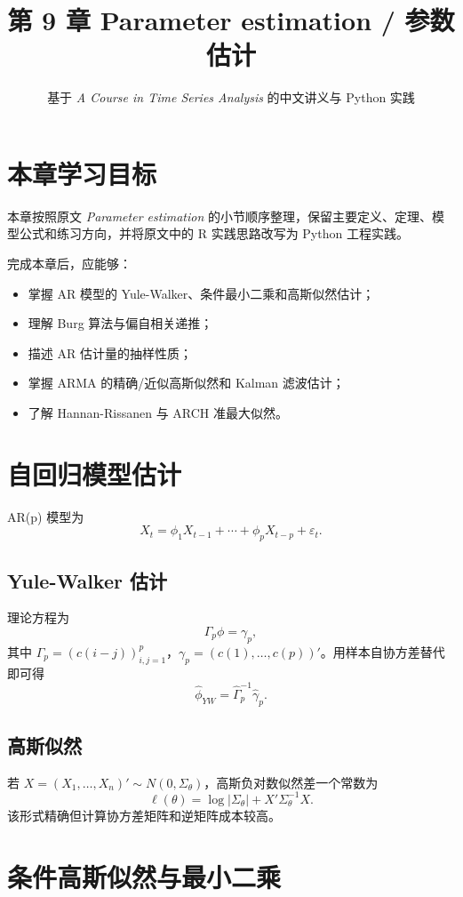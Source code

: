 \documentclass[11pt,a4paper]{ctexart}
\title{第 9 章 \quad Parameter estimation / 参数估计}
\author{基于 \textit{A Course in Time Series Analysis} 的中文讲义与 Python 实践}
\date{}
\begin{document}
\maketitle

\section*{本章学习目标}

本章按照原文 \textit{Parameter estimation} 的小节顺序整理，保留主要定义、定理、模型公式和练习方向，并将原文中的 R 实践思路改写为 Python 工程实践。

完成本章后，应能够：
\begin{itemize}
  \item 掌握 AR 模型的 Yule-Walker、条件最小二乘和高斯似然估计；
  \item 理解 Burg 算法与偏自相关递推；
  \item 描述 AR 估计量的抽样性质；
  \item 掌握 ARMA 的精确/近似高斯似然和 Kalman 滤波估计；
  \item 了解 Hannan-Rissanen 与 ARCH 准最大似然。
\end{itemize}

\section{自回归模型估计}

AR(p) 模型为
\[
  X_t=\phi_1X_{t-1}+\cdots+\phi_pX_{t-p}+\varepsilon_t.
\]
\subsection{Yule-Walker 估计}

理论方程为
\[
  \Gamma_p\phi=\gamma_p,
\]
其中 \(\Gamma_p=(c(i-j))_{i,j=1}^p\)，\(\gamma_p=(c(1),\ldots,c(p))'\)。用样本自协方差替代即可得
\[
  \hat\phi_{YW}=\hat\Gamma_p^{-1}\hat\gamma_p.
\]

\subsection{高斯似然}

若 \(X=(X_1,\ldots,X_n)'\sim N(0,\Sigma_\theta)\)，高斯负对数似然差一个常数为
\[
  \ell(\theta)=\log|\Sigma_\theta|+X'\Sigma_\theta^{-1}X.
\]
该形式精确但计算协方差矩阵和逆矩阵成本较高。

\section{条件高斯似然与最小二乘}
\end{document}
